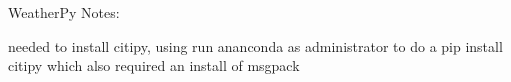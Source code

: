 WeatherPy Notes:

needed to install citipy, using run ananconda as administrator to do a pip install citipy which also required an install of msgpack

 
